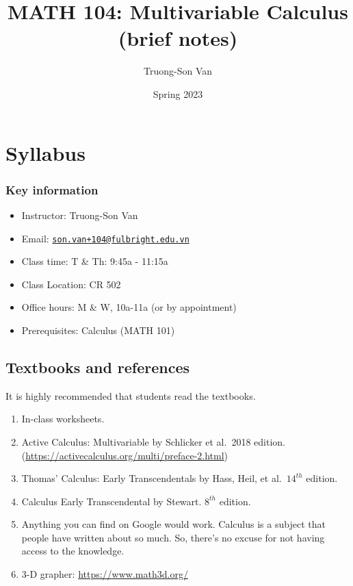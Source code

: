 \documentclass[
]{book}
\title{MATH 104: Multivariable Calculus (brief notes)}
\author{Truong-Son Van}
\date{Spring 2023}
\providecommand{\tightlist}{%
  \setlength{\itemsep}{0pt}\setlength{\parskip}{0pt}}
\theoremstyle{definition}
\theoremstyle{definition}
\theoremstyle{definition}
\theoremstyle{definition}
\theoremstyle{remark}
\begin{document}
\maketitle

{
\setcounter{tocdepth}{1}
\tableofcontents
}
\newcommand{\vectorproj}[2][]{\mathrm{proj}_{\vect{#1}}\vect{#2}}
\newcommand{\vectorcomp}[2][]{\mathrm{comp}_{\vect{#1}}\vect{#2}}
\newcommand{\vect}{\mathbf}

\hypertarget{syllabus}{%
\chapter*{Syllabus}\label{syllabus}}

\hypertarget{key-information}{%
\subsection*{Key information}\label{key-information}}

\begin{itemize}
\tightlist
\item
  Instructor: Truong-Son Van
\item
  Email: \href{mailto:son.van+104@fulbright.edu.vn}{\nolinkurl{son.van+104@fulbright.edu.vn}}
\item
  Class time: T \& Th: 9:45a - 11:15a
\item
  Class Location: CR 502
\item
  Office hours: M \& W, 10a-11a (or by appointment)
\item
  Prerequisites: Calculus (MATH 101)
\end{itemize}

\hypertarget{textbooks-and-references}{%
\section*{Textbooks and references}\label{textbooks-and-references}}

It is highly recommended that students read the textbooks.

\begin{enumerate}
\def\labelenumi{\arabic{enumi}.}
\item
  In-class worksheets.
\item
  Active Calculus: Multivariable by Schlicker et al.~2018 edition.
  (\url{https://activecalculus.org/multi/preface-2.html})
\item
  Thomas' Calculus: Early Transcendentals by Hass, Heil, et al.~\(14^{th}\) edition.
\item
  Calculus Early Transcendental by Stewart. \(8^{th}\) edition.
\item
  Anything you can find on Google would work.
  Calculus is a subject that people have written about
  so much. So, there's no excuse for not having access
  to the knowledge.
\item
  3-D grapher: \url{https://www.math3d.org/}
\end{enumerate}
\end{document}
